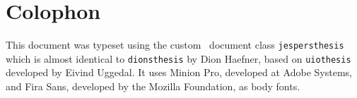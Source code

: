 \null
\vfill


\section*{Colophon}
This document was typeset using the custom \LaTeXe\ document class \texttt{jespersthesis} which is almost identical to \texttt{dionsthesis} by Dion Haefner, based on \texttt{uiothesis} developed by Eivind Uggedal. It uses Minion Pro, developed at Adobe Systems, and Fira Sans, developed by the Mozilla Foundation, as body fonts.
%
